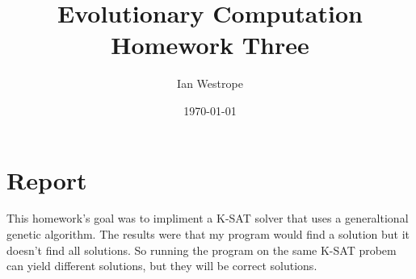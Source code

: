 \documentclass[12pt]{article}
\author{Ian Westrope}
\title{Evolutionary Computation Homework Three}
\date{\today}
\begin{document}
\maketitle

\section{Report}
 This homework's goal was to impliment a K-SAT solver that uses a generaltional genetic algorithm. The results were that my program would find a solution but it doesn't find all solutions. So running the program on the same K-SAT probem can yield different solutions, but they will be correct solutions.
\end{document}
